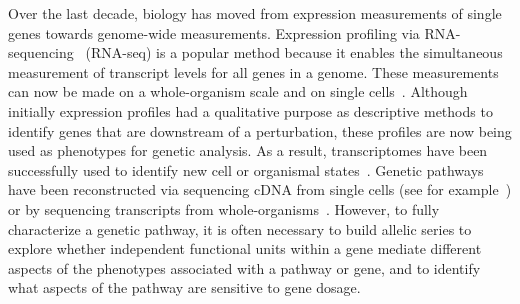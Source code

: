 \documentclass[10pt, twocolumn]{article}
\begin{document}
Over the last decade, biology has moved from expression measurements of single
genes towards genome-wide measurements. Expression profiling via
RNA-sequencing~\cite{Mortazavi2008} (RNA-seq) is a popular method because it
enables the simultaneous measurement of transcript levels for all genes in a
genome. These measurements can now be made on a whole-organism scale and on
single cells~\cite{Tang2009}. Although initially expression profiles had a
qualitative purpose as descriptive methods to identify genes that are downstream
of a perturbation, these profiles are now being used as phenotypes for genetic
analysis. As a result, transcriptomes have been successfully used to identify
new cell or organismal states~\cite{Angeles-Albores2017,Villani2017}. Genetic
pathways have been reconstructed via sequencing cDNA from single cells (see for
example~\cite{Dixit2016}) or by sequencing transcripts from
whole-organisms~\cite{AngelesAlboresHIF}. However, to fully characterize a
genetic pathway, it is often necessary to build allelic series to explore
whether independent functional units within a gene mediate different aspects of
the phenotypes associated with a pathway or gene, and to identify what aspects of
the pathway are sensitive to gene dosage.
\end{document}
